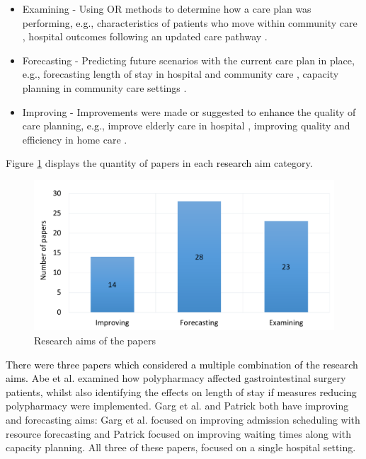\documentclass[../thesis.tex]{subfiles}
\begin{document}
\begin{itemize}
    \item Examining - Using OR methods to determine how a care plan was performing\textcolor{black}{, e.g.}, characteristics of patients who move within community care \cite{Gassoumis}, hospital outcomes following an updated care pathway \cite{Wallace}.
    \item Forecasting - Predicting future scenarios with the current care plan in place\textcolor{black}{, e.g.}, forecasting length of stay in hospital and community care \cite{Gordon2}, capacity planning in community care settings \cite{Bidhandi}.
    \item Improving - Improvements were made or suggested to \textcolor{black}{enhance} the quality of care planning\textcolor{black}{, e.g.}, improve elderly care in hospital \cite{Ragab}, improving quality and efficiency in home care \cite{Eveborn}.
\end{itemize}

Figure \ref{fig:Aims} displays the quantity of papers in each \textcolor{black}{research} aim category.

\begin{figure}[H]
\centering
    \includegraphics[scale = 0.3]{Chapter2/Figures/Focus1.pdf}
   \caption{Research aims of the papers}
   \label{fig:Aims}
\end{figure}

\textcolor{black}{There were three papers which considered a multiple combination of the research aims.} Abe et al. \cite{Abe} examined how polypharmacy \textcolor{black}{affected} gastrointestinal surgery patients, whilst also identifying the effects on length of stay if measures \textcolor{black}{reducing} polypharmacy were implemented. Garg et al. \cite{Garg2} and Patrick \cite{Patrick} both have improving and forecasting aims: Garg et al. focused on improving admission scheduling with resource forecasting and Patrick focused on improving waiting times along with capacity planning. All three of these papers, focused on a single hospital setting.
\end{document}
